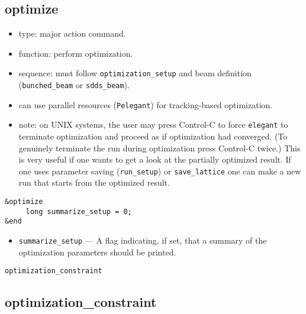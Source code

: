\documentclass[11pt]{article}
\begin{document}
\subsection{optimize \label{subsec:optimize}}

\begin{itemize}
\item type: major action command.
\item function: perform optimization.
\item sequence: must follow \verb|optimization_setup| and beam definition (\verb|bunched_beam| or \verb|sdds_beam|).
\item can use parallel resources (\verb|Pelegant|) for tracking-based optimization.
\item note: on UNIX systems, the user may press Control-C to force
\verb|elegant| to terminate optimization and proceed as if
optimization had converged.  (To genuinely terminate the run during
optimization press Control-C twice.) This is very useful if one wants
to get a look at the partially optimized result.  If one uses parameter
saving (\verb|run_setup|) or \verb|save_lattice| one can make a new
run that starts from the optimized result.

\end{itemize}

\begin{verbatim}
&optimize
     long summarize_setup = 0;
&end
\end{verbatim}

\begin{itemize}

\item \verb|summarize_setup| --- A flag indicating, if set, that a
summary of the optimization parameters should be printed.
\end{itemize}

\newpage
\begin{center}{\Large\verb|optimization_constraint|}\end{center}
\subsection{optimization\_constraint \label{subsec:optimizationconstraint}}
\end{document}
